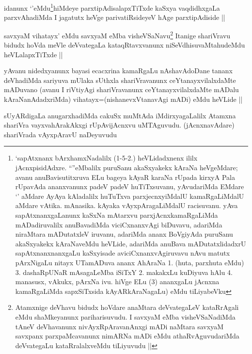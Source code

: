 \begin{artha}
idanunx `\stext'eMdu\footnote{`sapAtxnanx bArxhamxNadalilx (1-5-2.) heVLidadxnenx ililx jAcnxpisidAdxre. ``\stext''eMbalilx puruSanu akaSxyakekx kAraNa heVgeMdare; avanu anuBavisutitxruva ELu bageya kAyaR karaNa rUpada kirxyA Pala rUpavAda ananxvanunx padeV padeV huTiTxsuvanu, yAvudariMda EMdare `\stext' aMdare AyAya kAladalilx huTuTxva parxjecnxyiMdalU kamaRgaLiMdalU aMdare vAtika. mAnasika. kAyaka vAyxpAragaLiMdalU racisuvanu. yAva sapAtxnanxgaLanunx kaSxNa mAtarxvu parxjAcnxkamaRgaLiMda mADadiruvalilx anuBavadiMda viciCxnanxvAgi biDuvavu, adariMda niraMtara mADutatxleV iruvanu, adariMda ananx BoVgiyAda puruSanu akaSxyakekx kAraNaveMdu heVLide, adariMda anuBava mADutatxlidadxrU sapAtxnanxnanxgaLu kaSxyisade aviciCxnanxvAgiruvavu nAvu matutx pArxNigaLu nitayx UTamADuva ananx AhAraNa 1. (huta, parxhuta eMdu) 3. dashaRpUNaR mAsagaLeMba iSiTxY 2. makakxLu kuDiyuva hAlu 4. manasusx, vAkukx, pArxNa ivu. hiVge ELu (3) ananxgaLu jAcnxna kamaRgaLiMda sapxSiTxsida kAyARkAraNagaLu) eMdu tiLiyabeVku}hiMdeye parxtipAdisalapxTiTxde kaSxya vaqdidhxgaLa parxvAhadiMda I jagatutx heVge parivatiRsideyeV hAge parxtipAdiside ||
\end{artha}

\begin{artha}
savxyaM vihatayx' eMdu savxyaM eMba visheVSaNavu\footnote[2]{Atamxnige deVhavu bidudx hoVdare anaMtara deVvategaLeV kataRrAgali eMdu shaMkeyanunx pariharisuvudu. I savxyaM eMba visheVSaNadiMda tAneV deVhavanunx nivAyxRpAravanAnxgi mADi naMtara savxyaM savxpanx parxpaMcavanunx nimARNa mADi eMdu athaRvAguvudariMda deVvategaLu kataRralalxveMdu tiLiyuvudu ||} Itanige shariVravu bidudx hoVda meVle deVvategaLa kataqRtavxvanunx niSeVdhisuvaMtahudeMdu heVLalapxTiTxde ||
\end{artha}


\begin{artha}
yAvanu nidedxyanunx bayasi ecacxrina kamaRgaLu nAshavAdoDane tananx deVhadiMda sariyuva mUlaka sUthxla shariVravanunx ceYtanayxvilalxdaMte mADuvano (avanu I riVtiyAgi shariVravanunx ceYtanayxvilalxdaMte mADalu kAraNanAdadxriMda) vihatayx=(nishanevxVtanavAgi mADi) eMdu heVLide ||
\end{artha}


\begin{artha}
sUyARdigaLa anugarxhadiMda cakuSx muMtAda iMdirxyagaLalilx Atamxna shariVra vayxvahArakAkxgi rUpAvijAcnxvu uMTAguvudu. (jAcnxnavAdare) shariVrada vAyxpAravU naDeyuvudu
\end{artha}

